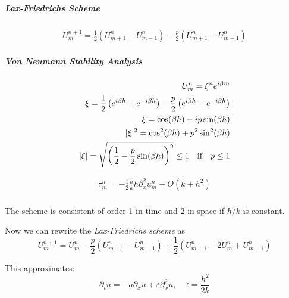 \subparagraph{Lax-Friedrichs Scheme}
\begin{align*}
  U_m^{n+1} = \frac{1}{2}\left( U_{m+1}^n + U_{m-1}^n \right) - \frac{p}{2}\left( U_{m+1}^n - U_{m-1}^n \right)
\end{align*}

\subparagraph{Von Neumann Stability Analysis}
\begin{align*}
  U_m^n = \xi^n e^{i\beta m}                                                                                            \\
  \xi = \frac{1}{2}\left( e^{i\beta h} + e^{-i\beta h} \right) - \frac{p}{2}\left( e^{i\beta h} - e^{-i\beta h} \right) \\
  \xi = \cos(\beta h) - ip\sin(\beta h)                                                                                 \\
  \lvert\xi\rvert^2 = \cos^2(\beta h) + p^2\sin^2(\beta h)                                                                    \\
  \lvert\xi\rvert = \sqrt{\left( \frac{1}{2} - \frac{p}{2}\sin(\beta h) \right)^2} \leq 1 \quad \text{if} \quad p \leq 1
\end{align*}

\begin{align*}
  \tau_m^n = -\frac{1}{2}\frac{h}{k}h \partial_x^2 u_m^n + O(k + h^2) \\
\end{align*}

The scheme is consistent of order 1 in time and 2 in space if \(h/k\) is constant.

Now we can rewrite the \textit{Lax-Friedrichs scheme} as
\[
  U_m^{n+1} = U_m^n - \frac{p}{2}\left( U_{m+1}^n - U_{m-1}^n \right) + \frac{1}{2}\left( U_{m+1}^n - 2U_m^n + U_{m-1}^n \right)
\]

This approximates:
\[
  \partial_t u = -a \partial_x u + \varepsilon \partial_x^2 u, \quad \varepsilon = \frac{h^2}{2k} \tag{Artificial diffusion}
\]

